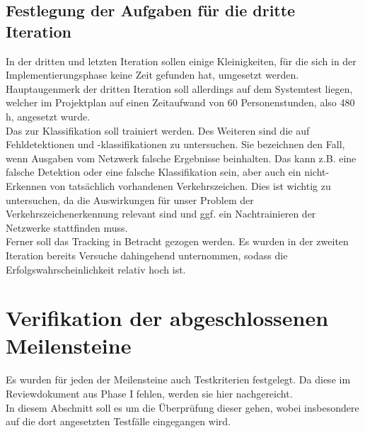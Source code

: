 \documentclass[12pt,a4paper,ngerman,enabledeprecatedfontcommands]{scrreprt}
\begin{document}
\section{Festlegung der Aufgaben für die dritte Iteration}
In der dritten und letzten Iteration sollen einige Kleinigkeiten, für die sich in der Implementierungsphase keine Zeit gefunden hat, umgesetzt werden. Hauptaugenmerk der dritten Iteration soll allerdings auf dem Systemtest liegen, welcher im Projektplan auf einen Zeitaufwand von 60 Personenstunden, also 480 h, angesetzt wurde.\\
Das  zur \gls{Klassifikation} soll trainiert werden. Des Weiteren sind die 
 auf Fehldetektionen und -klassifikationen zu untersuchen. Sie bezeichnen den Fall, wenn Ausgaben vom Netzwerk falsche Ergebnisse beinhalten.
Das kann z.B. eine falsche Detektion oder eine falsche Klassifikation sein, aber auch ein nicht-Erkennen von tatsächlich vorhandenen Verkehrszeichen.
Dies ist wichtig zu untersuchen, da die Auswirkungen für unser Problem der Verkehrszeichenerkennung relevant sind und ggf. ein Nachtrainieren der Netzwerke stattfinden muss.\\
Ferner soll das \gls{Tracking} in Betracht gezogen werden. Es wurden in der zweiten Iteration bereits Versuche dahingehend unternommen, sodass die Erfolgswahrscheinlichkeit relativ hoch ist.\\

\chapter{Verifikation der abgeschlossenen Meilensteine}
Es wurden für jeden der Meilensteine auch Testkriterien festgelegt. Da diese im Reviewdokument aus Phase I fehlen, werden sie hier nachgereicht.\\
In diesem Abschnitt soll es um die Überprüfung dieser gehen, wobei insbesondere auf die dort angesetzten Testfälle eingegangen wird. \\
\end{document}

